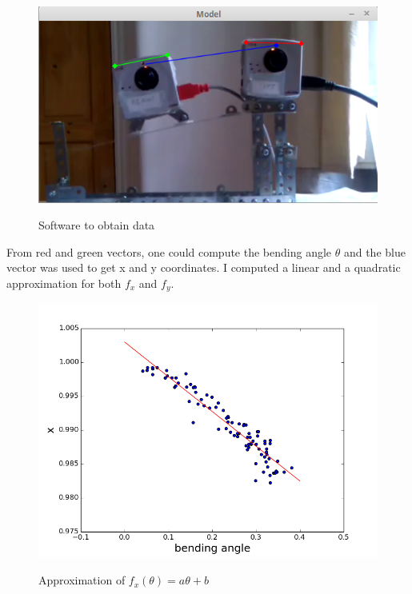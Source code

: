 \documentclass[11pt]{report}
\begin{document}
\begin{figure}[H]
    \begin{center}
        \includegraphics[scale=0.6]{images/model-software.png} 
        \label{fig:model-software}
        \caption{Software to obtain data}
    \end{center}
\end{figure}

From red and green vectors, one could compute the bending angle $\theta$ and the blue vector was used to get x and y coordinates.
I computed a linear and a quadratic approximation for both $f_x$ and $f_y$.

\begin{figure}[H]
    \begin{center}
        \includegraphics[scale=0.5]{images/model-linear-x.png}
        \label{fig:newmodelX}
        \caption{Approximation of $f_x(\theta) = a\theta + b$}
    \end{center}
\end{figure}
\end{document}
